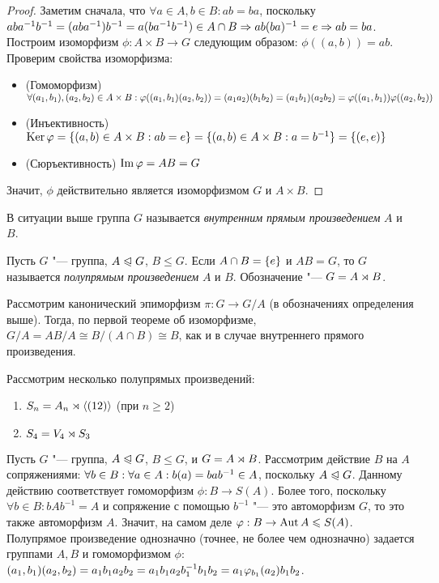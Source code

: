 \begin{proof}
	Заметим сначала, что $\forall a \in A, b \in B: ab = ba$, поскольку $aba^{-1}b^{-1} \hm= (aba^{-1})b^{-1} = a(ba^{-1}b^{-1}) \in A \cap B \ra ab(ba)^{-1} \hm= e \ra ab = ba$. Построим изоморфизм $\phi: A \times B \to G$ следующим образом: $\phi((a, b)) = ab$. Проверим свойства изоморфизма:
	\begin{itemize}
		\item (Гомоморфизм) $\forall (a_1, b_1), (a_2, b_2) \in A \times B: \phi((a_1, b_1)(a_2, b_2)) \hm= (a_1a_2)(b_1b_2) \hm= (a_1b_1)(a_2b_2) = \phi((a_1, b_1))\phi((a_2, b_2))$
		\item (Инъективность) $\ke\phi = \{(a, b) \in A \times B: ab = e\} = \{(a, b) \hm\in A \times B: a = b^{-1}\} \hm= \{(e, e)\}$
		\item (Сюръективность) $\operatorname{Im}\varphi = AB = G$
	\end{itemize}
	
	Значит, $\phi$ действительно является изоморфизмом $G$ и $A \times B$.
\end{proof}

\begin{note}
	В ситуации выше группа $G$ называется \textit{внутренним прямым произведением} $A$ и $B$.
\end{note}

\begin{definition}
	Пусть $G$ "--- группа, $A \trianglelefteqslant G$, $B \le G$. Если $A \cap B \hm= \{e\}$ и $AB = G$, то $G$ называется \textit{полупрямым произведением} $A$ и $B$. Обозначение "--- $G = A \rtimes B$.
\end{definition}

\begin{note}
	Рассмотрим канонический эпиморфизм $\pi: G \to G/A$ (в обозначениях определения выше). Тогда, по первой теореме об изоморфизме, $G / A = AB/A \cong B / (A \cap B) \cong B$, как и в случае внутреннего прямого произведения.
\end{note}

\begin{example} Рассмотрим несколько полупрямых произведений:
	\begin{enumerate}
		\item $S_n = A_n \rtimes \langle(12)\rangle$ (при $n \ge 2$)
		\item $S_4 = V_4 \rtimes S_3$
	\end{enumerate}
\end{example}

\begin{note}
	Пусть $G$ "--- группа, $A \trianglelefteqslant G$, $B \le G$, и $G = A \rtimes B$. Рассмотрим действие $B$ на $A$ сопряжениями: $\forall b \in B: \forall a \in A: b(a) \hm= bab^{-1} \in A$, поскольку $A \trianglelefteqslant G$. Данному действию соответствует гомоморфизм $\phi: B \to S(A)$. Более того, поскольку $\forall b \in B: bAb^{-1} = A$ и сопряжение с помощью $b^{-1}$ "--- это автоморфизм $G$, то это также автоморфизм $A$. Значит, на самом деле $\varphi: B \to \operatorname{Aut}{A} \leqslant S(A)$. Полупрямое произведение однозначно (точнее, не более чем однозначно) задается группами $A, B$ и гомоморфизмом $\phi$: $(a_1, b_1)(a_2, b_2) \hm= a_1b_1a_2b_2 = a_1b_1a_2b_1^{-1}b_1b_2 = a_1\phi_{b_1}(a_2)b_1b_2$.
\end{note}


